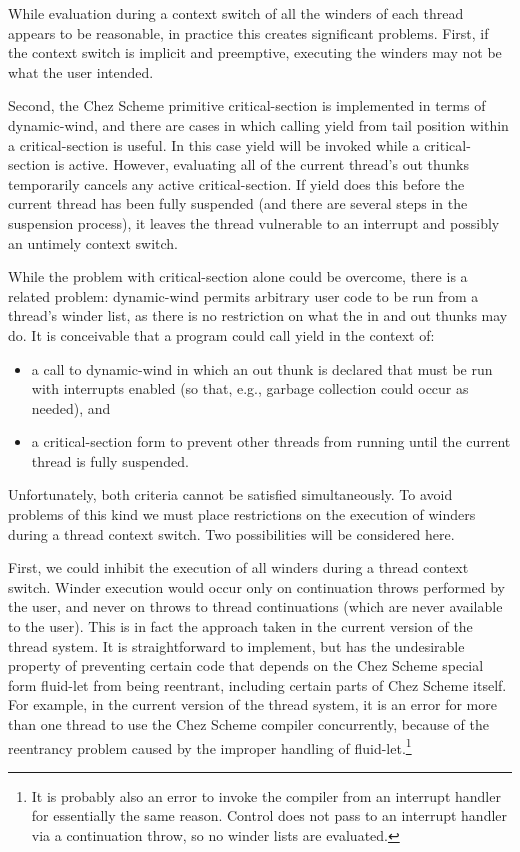 \documentclass{article}
\begin{document}
While evaluation during a context switch of all the winders of each
thread appears to be reasonable, in practice this creates significant
problems.  First, if the context switch is implicit and preemptive,
executing the winders may not be what the user intended.

Second, the Chez Scheme primitive {\sf critical-section} is
implemented in terms of {\sf dynamic-wind}, and there are cases in
which calling {\sf yield} from tail position within a {\sf
critical-section} is useful.  In this case {\sf yield} will be invoked
while a {\sf critical-section} is active. However, evaluating all of
the current thread's out thunks temporarily cancels any active {\sf
critical-section}.  If {\sf yield} does this before the current thread
has been fully suspended (and there are several steps in the
suspension process), it leaves the thread vulnerable to an interrupt
and possibly an untimely context switch.

While the problem with {\sf critical-section} alone could be overcome,
there is a related problem: {\sf dynamic-wind} permits arbitrary user
code to be run from a thread's winder list, as there is no restriction
on what the in and out thunks may do.  It is conceivable that a
program could call {\sf yield} in the context of:

\begin{itemize}

\item a call to {\sf dynamic-wind} in which an
out thunk is declared that must be run with interrupts enabled (so
that, e.g., garbage collection could occur as needed), and 

\item a
{\sf critical-section} form to prevent other threads from running until the
current thread is fully suspended. 
\end{itemize}

Unfortunately, both criteria cannot be satisfied simultaneously.  To
avoid problems of this kind we must place restrictions on the
execution of winders during a thread context switch.  Two
possibilities will be considered here.

First, we could inhibit the execution of all winders during a thread
context switch.  Winder execution would occur only on continuation
throws performed by the user, and never on throws to thread
continuations (which are never available to the user).  This is in
fact the approach taken in the current version of the thread system.
It is straightforward to implement, but has the undesirable property
of preventing certain code that depends on the Chez Scheme special
form {\sf fluid-let} from being reentrant, including certain parts of
Chez Scheme itself.  For example, in the current version of the thread
system, it is an error for more than one thread to use the Chez Scheme
compiler concurrently, because of the reentrancy problem caused by the
improper handling of {\sf fluid-let}.\footnote{It is probably also an
error to invoke the compiler from an interrupt handler for essentially
the same reason.  Control does not pass to an interrupt handler via a
continuation throw, so no winder lists are evaluated.}
\end{document}
